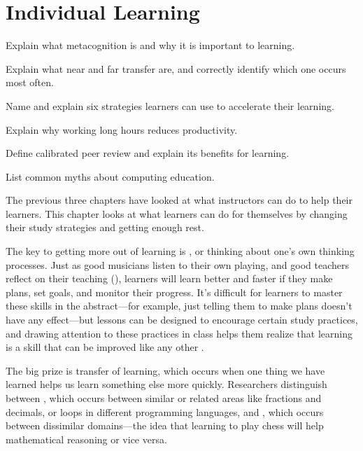 \chapter{Individual Learning}\label{s:individual}

\begin{objectives}

\item
  Explain what metacognition is and why it is important to learning.

\item
  Explain what near and far transfer are, and correctly identify which
  one occurs most often.

\item
  Name and explain six strategies learners can use to accelerate their
  learning.

\item
  Explain why working long hours reduces productivity.

\item
  Define calibrated peer review and explain its benefits for learning.

\item
  List common myths about computing education.

\end{objectives}

The previous three chapters have looked at what instructors can do to
help their learners.  This chapter looks at what learners can do for
themselves by changing their study strategies and getting enough rest.

The key to getting more out of learning is
, or thinking about one's own
thinking processes. Just as good musicians listen to their own
playing, and good teachers reflect on their teaching
(), learners will learn better and faster if
they make plans, set goals, and monitor their progress.  It's
difficult for learners to master these skills in the abstract---for
example, just telling them to make plans doesn't have any effect---but
lessons can be designed to encourage certain study practices, and
drawing attention to these practices in class helps them realize that
learning is a skill that can be improved like any other
\cite{McGu2015,Miya2018}.

The big prize is transfer of learning, which occurs when one thing we
have learned helps us learn something else more quickly.  Researchers
distinguish between , which
occurs between similar or related areas like fractions and decimals,
or loops in different programming languages, and
, which occurs between
dissimilar domains---the idea that learning to play chess will help
mathematical reasoning or vice versa.

